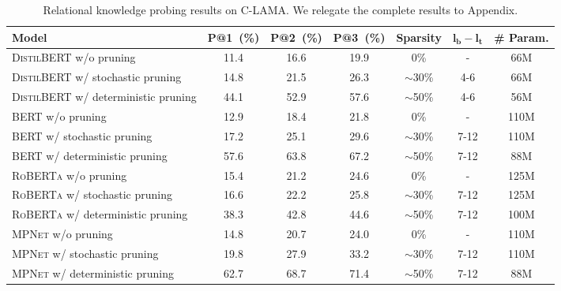 \begin{table}[t!]
	\centering
	\scriptsize
	\begin{tabular}{l|ccc|c|c|c}
		\toprule
		\textbf{Model} & \textbf{P@1~(\%)} & \textbf{P@2~(\%)} & \textbf{P@3~(\%)} & \textbf{Sparsity}  & $\bm{l_b-l_t}$ & \textbf{\# Param.}\\
		\midrule
		\textsc{DistilBERT} w/o pruning& 11.4 &16.6  &19.9  & 0\% & - & 66M\\
		\textsc{DistilBERT} w/ stochastic pruning & 14.8 &21.5 &26.3 & $\sim$30\% & 4-6 &66M \\
		\textsc{DistilBERT} w/ deterministic pruning & 44.1 &52.9 &57.6 & $\sim$50\% & 4-6 &56M \\
		\midrule
		\textsc{BERT} w/o pruning& 12.9 & 18.4  & 21.8 & 0\% & -  &110M\\
		\textsc{BERT} w/ stochastic pruning & 17.2 & 25.1  & 29.6  & $\sim$30\% & 7-12 & 110M\\
		\textsc{BERT} w/ deterministic pruning & 57.6 & 63.8  & 67.2  & $\sim$50\% & 7-12 & 88M\\
		\midrule
		\textsc{RoBERTa} w/o pruning& 15.4 & 21.2  & 24.6 & 0\% & - &125M  \\
		\textsc{RoBERTa} w/ stochastic pruning &16.6  &22.2   &25.8   & $\sim$30\% & 7-12 & 125M\\
		\textsc{RoBERTa} w/ deterministic pruning &38.3  &42.8   &44.6   & $\sim$50\% & 7-12 &100M \\
		\midrule
		\textsc{MPNet} w/o pruning& 14.8  &20.7   &24.0 & 0\%  & - & 110M\\
		\textsc{MPNet} w/ stochastic pruning &19.8  &27.9   &33.2  & $\sim$30\% & 7-12  & 110M\\
		\textsc{MPNet} w/ deterministic pruning &62.7  &68.7   &71.4  & $\sim$50\% & 7-12 &88M \\
		\bottomrule
	\end{tabular}
	\caption{Relational knowledge probing results on C-LAMA. We relegate the 
		complete results to Appendix.}
	\label{table:rank}
\end{table}

